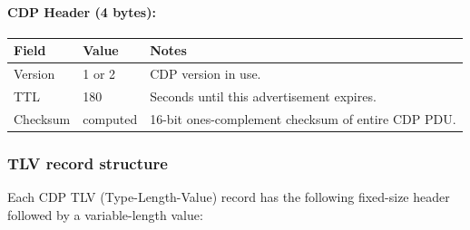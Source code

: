 \documentclass[12pt,a4paper]{article}
\begin{document}
\paragraph{CDP Header (4 bytes):}
\begin{center}
\begin{tabular}{lll}
\toprule
\textbf{Field}   & \textbf{Value}   & \textbf{Notes} \\
\midrule
Version          & 1 or 2           & CDP version in use. \\
TTL              & 180              & Seconds until this advertisement expires. \\
Checksum         & computed         & 16-bit ones-complement checksum of entire CDP PDU. \\
\bottomrule
\end{tabular}
\end{center}

\subsubsection{TLV record structure}

Each CDP TLV (Type-Length-Value) record has the following fixed-size header
followed by a variable-length value:

\begin{center}
\end{center}
\end{document}
